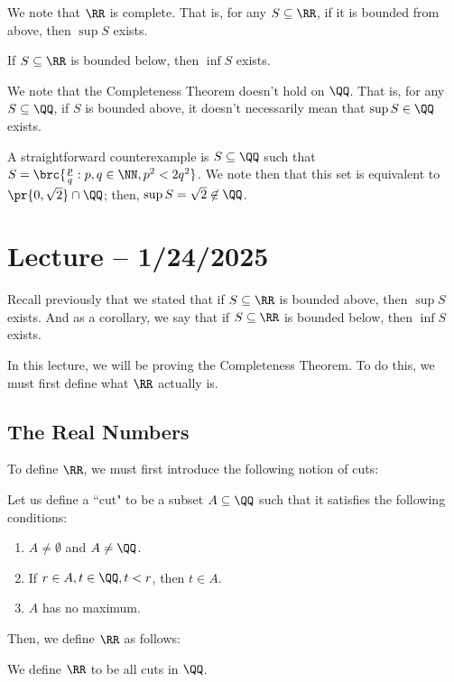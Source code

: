 \documentclass[openany]{book}
\begin{document}
\begin{thm}
	We note that $\RR$ is complete. That is, for any $S \subseteq \RR$, if it is bounded from above, then $\sup S$ exists.
\end{thm}
\begin{cor}
	If $S \subseteq \RR$ is bounded below, then $\inf S$ exists.
\end{cor}

\begin{rmk}
	We note that the Completeness Theorem doesn't hold on $\QQ$. That is, for any $S \subseteq \QQ$, if $S$ is bounded above, it doesn't necessarily mean that $\sup S \in \QQ$ exists.
	
	A straightforward counterexample is $S \subseteq \QQ$ such that $S = \brc{\frac{p}{q} : p, q \in \NN, p^{2} < 2q^{2}}$. We note then that this set is equivalent to $\pr{0, \sqrt{2}} \cap \QQ$; then, $\sup S = \sqrt{2} \not\in \QQ$. 
\end{rmk}

\section{Lecture -- 1/24/2025}
Recall previously that we stated that if $S \subseteq \RR$ is bounded above, then $\sup S$ exists. And as a corollary, we say that if $S \subseteq \RR$ is bounded below, then $\inf S$ exists.

In this lecture, we will be proving the Completeness Theorem. To do this, we must first define what $\RR$ actually is.

\subsection{The Real Numbers}
To define $\RR$, we must first introduce the following notion of cuts:
\begin{defn}[Cut]
	Let us define a ``cut" to be a subset $A \subseteq \QQ$ such that it satisfies the following conditions:
	\begin{enumerate}
		\item $A \neq \emptyset$ and $A \neq \QQ$.
		\item If $r \in A, t \in \QQ, t < r$, then $t \in A$.
		\item $A$ has no maximum.
	\end{enumerate}
\end{defn}

Then, we define $\RR$ as follows:
\begin{defn}[$\RR$]
	We define $\RR$ to be all cuts in $\QQ$. 
\end{defn}
\end{document}
